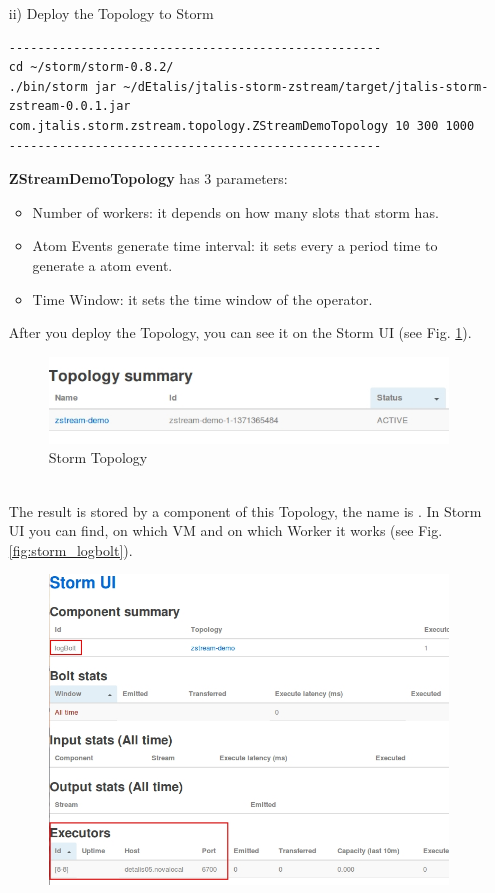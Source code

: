 \documentclass[a4paper, 12pt]{article}
\begin{document}
\begin{itemize}
\begin{itemize}
\item[ii)] Deploy the Topology to Storm\\
\lstset{
    breaklines     = true,
    stepnumber     = 0,
}
\begin{lstlisting}
----------------------------------------------------
cd ~/storm/storm-0.8.2/
./bin/storm jar ~/dEtalis/jtalis-storm-zstream/target/jtalis-storm-zstream-0.0.1.jar com.jtalis.storm.zstream.topology.ZStreamDemoTopology 10 300 1000
----------------------------------------------------
\end{lstlisting}
\textbf{ZStreamDemoTopology} has 3 parameters:
\begin{itemize}
\item Number of workers: it depends on how many slots that storm has.
\item Atom Events generate time interval: it sets every a period time to generate a atom event.
\item Time Window: it sets the time window of the operator.
\end{itemize}
After you deploy the Topology, you can see it on the Storm UI (see Fig. \ref{fig:storm_topology}).
\begin{figure}[!h]
  \begin{center}
    	\includegraphics[width=14cm]{photo/storm_topology.jpg}
    	\caption{Storm Topology}
    \label{fig:storm_topology}
  \end{center}
\end{figure}\\
The result is stored by a component of this Topology, the name is . In Storm UI you can find, on which VM and on which Worker it works (see Fig. \ref{fig:storm_logbolt}). 
\begin{figure}[!h]
  \begin{center}
    	\includegraphics[width=16cm]{photo/storm_logbolt.jpg}

\end{center}
\end{figure}
\end{itemize}
\end{itemize}
\end{document}
